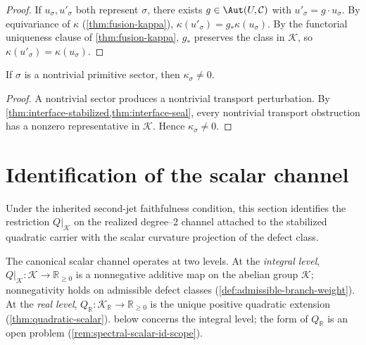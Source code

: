 \begin{proof}
If $u_\sigma, u'_\sigma$ both represent $\sigma$, there exists
$g \in \Aut(U,\mathcal C)$ with $u'_\sigma = g \cdot u_\sigma$.
By equivariance of $\kappa$ (\cref{thm:fusion-kappa}),
$\kappa(u'_\sigma) = g_* \kappa(u_\sigma)$.
By the functorial uniqueness clause of \cref{thm:fusion-kappa},
$g_*$ preserves the class in $\mathcal K$, so
$\kappa(u'_\sigma) = \kappa(u_\sigma)$.
\end{proof}

\begin{lemma}
\label{lem:spectral-defect-nonzero}
If $\sigma$ is a nontrivial primitive sector, then $\kappa_\sigma \neq 0$.
\end{lemma}

\begin{proof}
A nontrivial sector produces a nontrivial transport perturbation.
By \cref{thm:interface-stabilized,thm:interface-seal}, every nontrivial
transport obstruction has a nonzero representative in $\mathcal K$.
Hence $\kappa_\sigma \neq 0$.
\end{proof}

\section{Identification of the scalar channel}
\label{sec:spectral-scalar-id}

Under the inherited second-jet faithfulness condition, this section
identifies the restriction $Q|_{\mathcal K}$ on the realized
degree--\(2\) channel attached to the stabilized quadratic carrier
with the scalar curvature projection of the defect class.

\begin{remark}
\label{rem:two-levels-Q}
The canonical scalar channel operates at two levels.
At the \emph{integral level}, $Q|_{\mathcal K} : \mathcal K \to
\mathbb R_{\geq 0}$ is a nonneg\-ative additive map on the abelian group
$\mathcal K$; nonneg\-ativity holds on admissible defect classes
(\cref{def:admissible-branch-weight}).
At the \emph{real level}, $Q_{\mathbb R} : \mathcal K_{\mathbb R} \to
\mathbb R_{\geq 0}$ is the unique positive quadratic extension
(\cref{thm:quadratic-scalar}).
 below concerns the integral
level; the form of $Q_{\mathbb R}$ is an open problem
(\cref{rem:spectral-scalar-id-scope}).
\end{remark}

